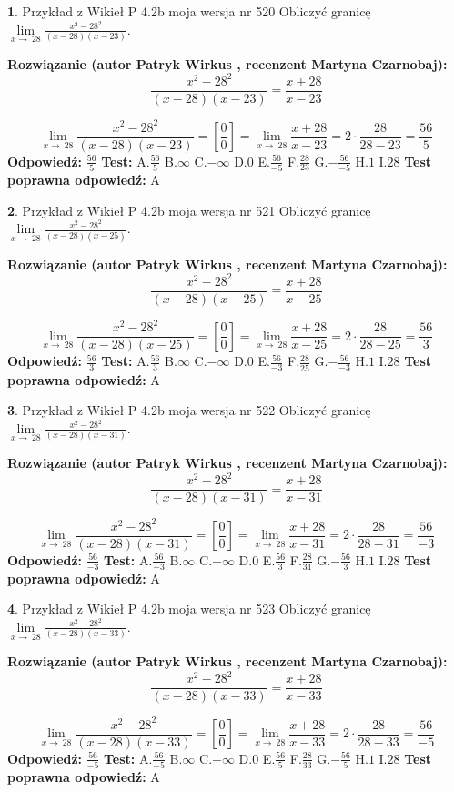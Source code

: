 \documentclass[12pt, a4paper]{article}
\theoremstyle{definition} %
\newtheorem{zad}{}
\newcommand{\zadStart}[1]{\begin{zad}#1\newline}
\newcommand{\zadStop}{\end{zad}}
\newcommand{\rozwStart}[2]{\noindent \textbf{Rozwiązanie (autor #1 , recenzent #2): }\newline}
\newcommand{\rozwStop}{\newline}
\newcommand{\odpStart}{\noindent \textbf{Odpowiedź:}\newline}
\newcommand{\odpStop}{\newline}
\newcommand{\testStart}{\noindent \textbf{Test:}\newline}
\newcommand{\testStop}{\newline}
\newcommand{\kluczStart}{\noindent \textbf{Test poprawna odpowiedź:}\newline}
\newcommand{\kluczStop}{\newline}
\begin{document}
\zadStart{Przykład z Wikieł P 4.2b moja wersja nr 520}
Obliczyć granicę $\lim\limits_{x\to\ 28}\frac{x^{2}-28^{2}}{(x-28)(x-23)}$.
\zadStop
\rozwStart{Patryk Wirkus}{Martyna Czarnobaj}
$$\frac{x^{2}-28^{2}}{(x-28)(x-23)}=\frac{x+28}{x-23}$$

$$\lim\limits_{x\to\ 28}\frac{x^{2}-28^{2}}{(x-28)(x-23)}=[\frac{0}{0}]=\lim\limits_{x\to\ 28}\frac{x+28}{x-23}=2 \cdot \frac{28}{28-23} = \frac{56}{5}$$
\rozwStop
\odpStart
$\frac{56}{5}$
\odpStop
\testStart
A.$\frac{56}{5}$
B.$\infty$
C.$-\infty$
D.$0$
E.$\frac{56}{-5}$
F.$\frac{28}{23}$
G.$-\frac{56}{-5}$
H.$1$
I.$28$
\testStop
\kluczStart
A
\kluczStop



\zadStart{Przykład z Wikieł P 4.2b moja wersja nr 521}
Obliczyć granicę $\lim\limits_{x\to\ 28}\frac{x^{2}-28^{2}}{(x-28)(x-25)}$.
\zadStop
\rozwStart{Patryk Wirkus}{Martyna Czarnobaj}
$$\frac{x^{2}-28^{2}}{(x-28)(x-25)}=\frac{x+28}{x-25}$$

$$\lim\limits_{x\to\ 28}\frac{x^{2}-28^{2}}{(x-28)(x-25)}=[\frac{0}{0}]=\lim\limits_{x\to\ 28}\frac{x+28}{x-25}=2 \cdot \frac{28}{28-25} = \frac{56}{3}$$
\rozwStop
\odpStart
$\frac{56}{3}$
\odpStop
\testStart
A.$\frac{56}{3}$
B.$\infty$
C.$-\infty$
D.$0$
E.$\frac{56}{-3}$
F.$\frac{28}{25}$
G.$-\frac{56}{-3}$
H.$1$
I.$28$
\testStop
\kluczStart
A
\kluczStop



\zadStart{Przykład z Wikieł P 4.2b moja wersja nr 522}
Obliczyć granicę $\lim\limits_{x\to\ 28}\frac{x^{2}-28^{2}}{(x-28)(x-31)}$.
\zadStop
\rozwStart{Patryk Wirkus}{Martyna Czarnobaj}
$$\frac{x^{2}-28^{2}}{(x-28)(x-31)}=\frac{x+28}{x-31}$$

$$\lim\limits_{x\to\ 28}\frac{x^{2}-28^{2}}{(x-28)(x-31)}=[\frac{0}{0}]=\lim\limits_{x\to\ 28}\frac{x+28}{x-31}=2 \cdot \frac{28}{28-31} = \frac{56}{-3}$$
\rozwStop
\odpStart
$\frac{56}{-3}$
\odpStop
\testStart
A.$\frac{56}{-3}$
B.$\infty$
C.$-\infty$
D.$0$
E.$\frac{56}{3}$
F.$\frac{28}{31}$
G.$-\frac{56}{3}$
H.$1$
I.$28$
\testStop
\kluczStart
A
\kluczStop



\zadStart{Przykład z Wikieł P 4.2b moja wersja nr 523}
Obliczyć granicę $\lim\limits_{x\to\ 28}\frac{x^{2}-28^{2}}{(x-28)(x-33)}$.
\zadStop
\rozwStart{Patryk Wirkus}{Martyna Czarnobaj}
$$\frac{x^{2}-28^{2}}{(x-28)(x-33)}=\frac{x+28}{x-33}$$

$$\lim\limits_{x\to\ 28}\frac{x^{2}-28^{2}}{(x-28)(x-33)}=[\frac{0}{0}]=\lim\limits_{x\to\ 28}\frac{x+28}{x-33}=2 \cdot \frac{28}{28-33} = \frac{56}{-5}$$
\rozwStop
\odpStart
$\frac{56}{-5}$
\odpStop
\testStart
A.$\frac{56}{-5}$
B.$\infty$
C.$-\infty$
D.$0$
E.$\frac{56}{5}$
F.$\frac{28}{33}$
G.$-\frac{56}{5}$
H.$1$
I.$28$
\testStop
\kluczStart
A
\kluczStop
\end{document}
